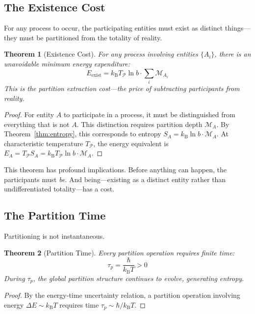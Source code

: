 ﻿\documentclass[twocolumn,10pt,a4paper]{article}
\newtheorem{theorem}{Theorem}[section]
\theoremstyle{definition}
\theoremstyle{remark}
\newcommand{\kB}{k_{\mathrm{B}}}
\newcommand{\Depth}{\mathcal{M}}
\newcommand{\Part}{\mathcal{P}}
\begin{document}
\subsection{The Existence Cost}

For any process to occur, the participating entities must exist as distinct things---they must be partitioned from the totality of reality.

\begin{theorem}[Existence Cost]
\label{thm:existence}
For any process involving entities $\{A_i\}$, there is an unavoidable minimum energy expenditure:
\begin{equation}
    E_{\mathrm{exist}} = \kB T_{\Part} \ln b \cdot \sum_i \Depth_{A_i}
\end{equation}
This is the partition extraction cost---the price of subtracting participants from reality.
\end{theorem}

\begin{proof}
For entity $A$ to participate in a process, it must be distinguished from everything that is not $A$. This distinction requires partition depth $\Depth_A$. By Theorem~\ref{thm:entropy}, this corresponds to entropy $S_A = \kB \ln b \cdot \Depth_A$. At characteristic temperature $T_{\Part}$, the energy equivalent is $E_A = T_{\Part} S_A = \kB T_{\Part} \ln b \cdot \Depth_A$.
\end{proof}

This theorem has profound implications. Before anything can happen, the participants must \emph{be}. And being---existing as a distinct entity rather than undifferentiated totality---has a cost.

\subsection{The Partition Time}

Partitioning is not instantaneous.

\begin{theorem}[Partition Time]
\label{thm:time}
Every partition operation requires finite time:
\begin{equation}
    \tau_p = \frac{\hbar}{\kB T} > 0
\end{equation}
During $\tau_p$, the global partition structure continues to evolve, generating entropy.
\end{theorem}

\begin{proof}
By the energy-time uncertainty relation, a partition operation involving energy $\Delta E \sim \kB T$ requires time $\tau_p \sim \hbar/\kB T$.
\end{proof}
\end{document}

